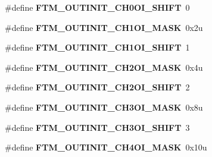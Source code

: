 \begin{DoxyCompactItemize}
\item 
\#define {\bfseries F\+T\+M\+\_\+\+O\+U\+T\+I\+N\+I\+T\+\_\+\+C\+H0\+O\+I\+\_\+\+S\+H\+I\+FT}~0\hypertarget{group__FTM__Register__Masks_ga3fdff5ede58f533fe4ecc296db939b4b}{}\label{group__FTM__Register__Masks_ga3fdff5ede58f533fe4ecc296db939b4b}

\item 
\#define {\bfseries F\+T\+M\+\_\+\+O\+U\+T\+I\+N\+I\+T\+\_\+\+C\+H1\+O\+I\+\_\+\+M\+A\+SK}~0x2u\hypertarget{group__FTM__Register__Masks_ga36d7ebc12c5244ef6852a0327113420e}{}\label{group__FTM__Register__Masks_ga36d7ebc12c5244ef6852a0327113420e}

\item 
\#define {\bfseries F\+T\+M\+\_\+\+O\+U\+T\+I\+N\+I\+T\+\_\+\+C\+H1\+O\+I\+\_\+\+S\+H\+I\+FT}~1\hypertarget{group__FTM__Register__Masks_ga419aab88bd101c374e1f1be56d122a35}{}\label{group__FTM__Register__Masks_ga419aab88bd101c374e1f1be56d122a35}

\item 
\#define {\bfseries F\+T\+M\+\_\+\+O\+U\+T\+I\+N\+I\+T\+\_\+\+C\+H2\+O\+I\+\_\+\+M\+A\+SK}~0x4u\hypertarget{group__FTM__Register__Masks_ga06ffa599245bdf8bb3c19f45a11f96f4}{}\label{group__FTM__Register__Masks_ga06ffa599245bdf8bb3c19f45a11f96f4}

\item 
\#define {\bfseries F\+T\+M\+\_\+\+O\+U\+T\+I\+N\+I\+T\+\_\+\+C\+H2\+O\+I\+\_\+\+S\+H\+I\+FT}~2\hypertarget{group__FTM__Register__Masks_ga25aa50131bfe6d3c09b6508e718bb638}{}\label{group__FTM__Register__Masks_ga25aa50131bfe6d3c09b6508e718bb638}

\item 
\#define {\bfseries F\+T\+M\+\_\+\+O\+U\+T\+I\+N\+I\+T\+\_\+\+C\+H3\+O\+I\+\_\+\+M\+A\+SK}~0x8u\hypertarget{group__FTM__Register__Masks_gaaa0b4f972bca3194e69fbe94021f3471}{}\label{group__FTM__Register__Masks_gaaa0b4f972bca3194e69fbe94021f3471}

\item 
\#define {\bfseries F\+T\+M\+\_\+\+O\+U\+T\+I\+N\+I\+T\+\_\+\+C\+H3\+O\+I\+\_\+\+S\+H\+I\+FT}~3\hypertarget{group__FTM__Register__Masks_ga083d497bae99715e175c5e73e27d3313}{}\label{group__FTM__Register__Masks_ga083d497bae99715e175c5e73e27d3313}

\item 
\#define {\bfseries F\+T\+M\+\_\+\+O\+U\+T\+I\+N\+I\+T\+\_\+\+C\+H4\+O\+I\+\_\+\+M\+A\+SK}~0x10u\hypertarget{group__FTM__Register__Masks_gab451c20f7002deae668749b6a886ca84}{}\label{group__FTM__Register__Masks_gab451c20f7002deae668749b6a886ca84}


\end{DoxyCompactItemize}
